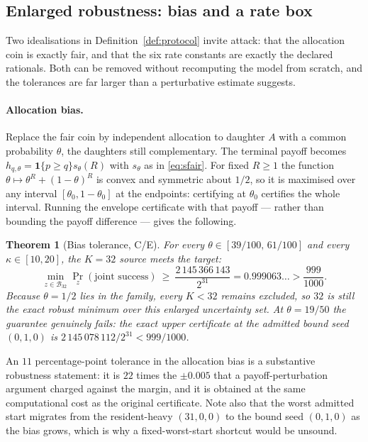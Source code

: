 \documentclass[11pt]{article}
\theoremstyle{plain}
\newtheorem{theorem}{Theorem}[section]
\theoremstyle{definition}
\theoremstyle{remark}
\newcommand{\one}{\mathbf{1}}
\begin{document}
\subsection{Enlarged robustness: bias and a rate box}\label{sec:enlarged}

Two idealisations in Definition~\ref{def:protocol} invite attack: that the
allocation coin is exactly fair, and that the six rate constants are exactly
the declared rationals. Both can be removed without recomputing the model from
scratch, and the tolerances are far larger than a perturbative estimate
suggests.

\paragraph{Allocation bias.} Replace the fair coin by independent allocation
to daughter $A$ with a common probability $\theta$, the daughters still
complementary. The terminal payoff becomes $h_{q,\theta}=\one\{p\ge
q\}s_\theta(R)$ with $s_\theta$ as in \eqref{eq:sfair}. For fixed $R\ge1$ the
function $\theta\mapsto\theta^{R}+(1-\theta)^{R}$ is convex and symmetric
about $1/2$, so it is maximised over any interval $[\theta_0,1-\theta_0]$ at
the endpoints: certifying at $\theta_0$ certifies the whole interval. Running
the envelope certificate with that payoff --- rather than bounding the payoff
difference --- gives the following.

\begin{theorem}[Bias tolerance, C/E]\label{thm:bias}
For every $\theta\in[39/100,\,61/100]$ and every $\kappa\in[10,20]$, the
$K=32$ source meets the target:
\[
\min_{z\in\mathcal{B}_{32}}\Pr_z(\text{joint success})\ \ge\
\frac{2\,145\,366\,143}{2^{31}}=0.999063\ldots>\frac{999}{1000}.
\]
Because $\theta=1/2$ lies in the family, every $K<32$ remains excluded, so
$32$ is still the exact robust minimum over this enlarged uncertainty set. At
$\theta=19/50$ the guarantee genuinely fails: the exact upper certificate at
the admitted bound seed $(0,1,0)$ is $2\,145\,078\,112/2^{31}<999/1000$.
\end{theorem}

An $11$ percentage-point tolerance in the allocation bias is a substantive
robustness statement: it is $22$ times the $\pm0.005$ that a
payoff-perturbation argument charged against the margin, and it is obtained
at the same computational cost as the original certificate. Note also that the
worst admitted start migrates from the resident-heavy $(31,0,0)$ to the bound
seed $(0,1,0)$ as the bias grows, which is why a fixed-worst-start shortcut
would be unsound.
\end{document}
